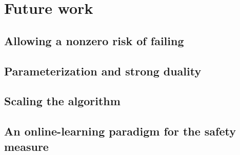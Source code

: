 \chapter{Future work}


\section{Allowing a nonzero risk of failing}

\section{Parameterization and strong duality}

\section{Scaling the algorithm}

\section{An online-learning paradigm for the safety measure}